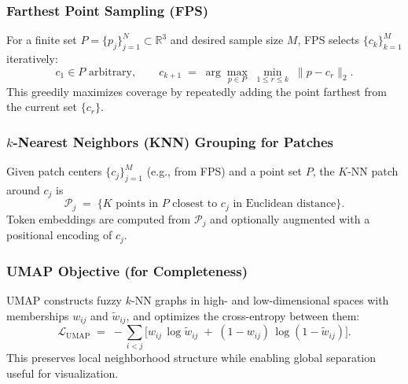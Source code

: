 \subsubsection{Farthest Point Sampling (FPS)}
For a finite set $P=\{p_j\}_{j=1}^N \subset \mathbb{R}^3$ and desired sample size $M$, FPS selects $\{c_k\}_{k=1}^M$ iteratively:
\begin{equation}
c_1 \in P \text{ arbitrary}, \qquad
c_{k+1} \;=\; \arg\max_{p \in P} \; \min_{1 \leq r \leq k} \;\|p - c_r\|_2.
\end{equation}
This greedily maximizes coverage by repeatedly adding the point farthest from the current set $\{c_r\}$.

\subsubsection{$k$-Nearest Neighbors (KNN) Grouping for Patches}
Given patch centers $\{c_j\}_{j=1}^M$ (e.g., from FPS) and a point set $P$, the $K$-NN patch around $c_j$ is
\begin{equation}
\mathcal{P}_j \;=\; \{ \text{$K$ points in $P$ closest to } c_j \text{ in Euclidean distance} \}.
\end{equation}
Token embeddings are computed from $\mathcal{P}_j$ and optionally augmented with a positional encoding of $c_j$.

\subsubsection{UMAP Objective (for Completeness)}
UMAP constructs fuzzy $k$-NN graphs in high- and low-dimensional spaces with memberships $w_{ij}$ and $\tilde{w}_{ij}$, and optimizes the cross-entropy between them:
\begin{equation}
\mathcal{L}_{\mathrm{UMAP}} \;=\; - \sum_{i<j} \Big[ w_{ij}\,\log \tilde{w}_{ij} \;+\; (1-w_{ij})\,\log (1-\tilde{w}_{ij}) \Big].
\end{equation}
This preserves local neighborhood structure while enabling global separation useful for visualization.
